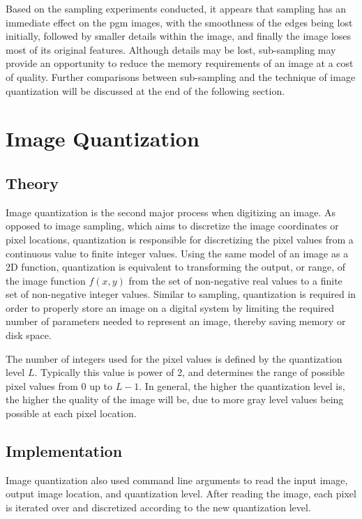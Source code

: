 \documentclass[headings=optiontoheadandtoc,listof=totoc,parskip=full]{scrartcl}
\begin{document}
Based on the sampling experiments conducted, it appears that sampling has an immediate effect on the pgm images, with the smoothness of the edges being lost initially, followed by smaller details within the image, and finally the image loses most of its original features. Although details may be lost, sub-sampling may provide an opportunity to reduce the memory requirements of an image at a cost of quality. Further comparisons between sub-sampling and the technique of image quantization will be discussed at the end of the following section.

\section{Image Quantization}

\subsection{Theory}
Image quantization is the second major process when digitizing an image. As opposed to image sampling, which aims to discretize the image coordinates or pixel locations, quantization is responsible for discretizing the pixel values from a continuous value to finite integer values. Using the same model of an image as a 2D function, quantization is equivalent to transforming the output, or range, of the image function $f(x,y)$ from the set of non-negative real values to a finite set of non-negative integer values. Similar to sampling, quantization is required in order to properly store an image on a digital system by limiting the required number of parameters needed to represent an image, thereby saving memory or disk space.

The number of integers used for the pixel values is defined by the quantization level $L$. Typically this value is power of 2, and determines the range of possible pixel values from 0 up to $L-1$. In general, the higher the quantization level is, the higher the quality of the image will be, due to more gray level values being possible at each pixel location. 

\subsection{Implementation}

Image quantization also used command line arguments to read the input image, output image location, and quantization level. After reading the image, each pixel is iterated over and discretized according to the new quantization level. 
\end{document}
